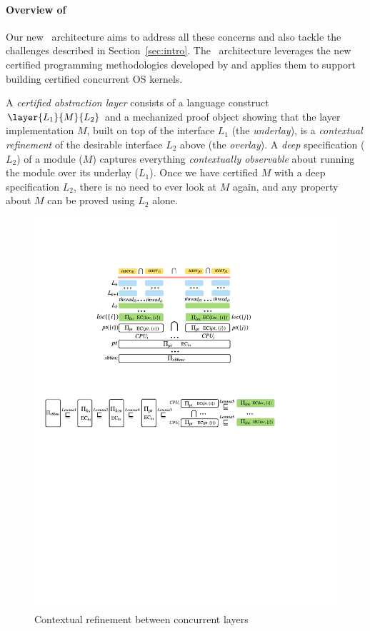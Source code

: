 
\vspace*{-10pt}
\paragraph{Overview of \CTOS}
Our new \CTOS\ architecture aims to address all these concerns and
also tackle the challenges described in Section~\ref{sec:intro}.  The
\CTOS\ architecture leverages the new certified programming
methodologies developed by \citet{dscal15,ccal16} and applies them to
support building certified concurrent OS kernels.

A {\em certified abstraction layer} consists of a language construct
$\layer{L_1}{M}{L_2}$ and a mechanized proof object showing that the
layer implementation $M$, built on top of the interface $L_1$ (the
{\em underlay}), is a {\em contextual refinement} of the desirable
interface $L_2$ above (the {\em overlay}). A {\em deep} specification
($L_2$) of a module ($M$) captures everything {\em contextually
  observable} about running the module over its underlay ($L_1$). Once
we have certified $M$ with a deep specification $L_2$, there is no
need to ever look at $M$ again, and any property about $M$ can be
proved using $L_2$ alone.

\begin{figure}\centering
\includegraphics[scale=0.7]{figs/refine_layer}
\caption{Contextual refinement between concurrent layers}
\label{fig:spec:refine_layer}
\vspace*{-10pt}
\end{figure}


